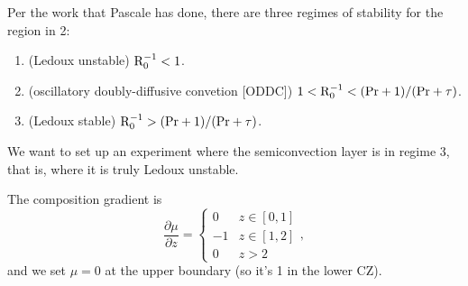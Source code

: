\documentclass[onecolumn, amsmath, amsfonts, amssymb]{aastex62}
\begin{document}
Per the work that Pascale has done, there are three regimes of stability for the region in 2:
\begin{enumerate}
    \item (Ledoux unstable) $\rm{R}_0^{-1} < 1$.
    \item (oscillatory doubly-diffusive convetion [ODDC]) $1 < \rm{R}_0^{-1} < (\rm{Pr} + 1)/(\rm{Pr} + \tau)$.
    \item (Ledoux stable) $\rm{R}_0^{-1} > (\rm{Pr} + 1)/(\rm{Pr} + \tau)$.
\end{enumerate}
We want to set up an experiment where the semiconvection layer is in regime 3, that is, where it is truly Ledoux unstable.

The composition gradient is
\begin{equation}
    \frac{\partial \mu}{\partial z} = 
    \begin{cases}
    0   & z \in [0, 1] \\
    -1 & z \in [1, 2] \\
    0 & z > 2
    \end{cases},
\end{equation}
and we set $\mu = 0$ at the upper boundary (so it's 1 in the lower CZ).
\end{document}

